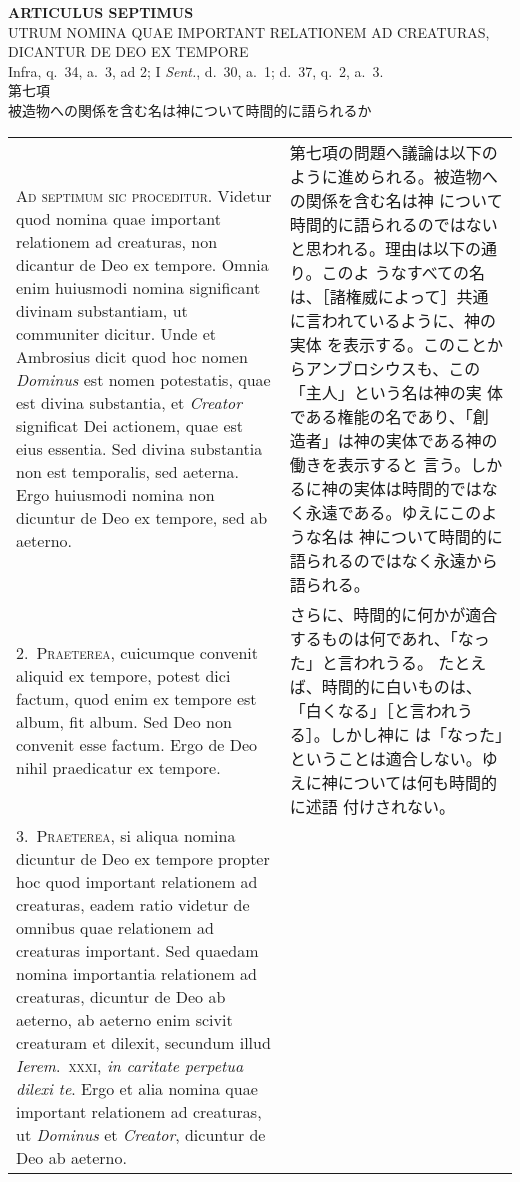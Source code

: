 \documentclass[paper=a4paper,fontsize=10pt,jafontsize=9pt,titlepage]{jlreq}
\begin{document}
\begin{center}
{\Large {\bfseries ARTICULUS SEPTIMUS}}\\
{\large UTRUM NOMINA QUAE IMPORTANT RELATIONEM AD CREATURAS, DICANTUR
DE DEO EX TEMPORE}\\
{\footnotesize Infra, q.~34, a.~3, ad 2; I {\itshape Sent.}, d.~30,
a.~1; d.~37, q.~2, a.~3.}\\
{\Large 第七項\\被造物への関係を含む名は神について時間的に語られるか}
\end{center}

\begin{longtable}{p{21em}p{21em}}

{\huge A}{\scshape d septimum sic proceditur}. Videtur quod nomina
quae important relationem ad creaturas, non dicantur de Deo ex
tempore. Omnia enim huiusmodi nomina significant divinam substantiam,
ut communiter dicitur. Unde et Ambrosius dicit quod hoc nomen
{\itshape Dominus} est nomen potestatis, quae est divina substantia,
et {\itshape Creator} significat Dei actionem, quae est eius
essentia. Sed divina substantia non est temporalis, sed aeterna. Ergo
huiusmodi nomina non dicuntur de Deo ex tempore, sed ab aeterno.

&

第七項の問題へ議論は以下のように進められる。被造物への関係を含む名は神
について時間的に語られるのではないと思われる。理由は以下の通り。このよ
うなすべての名は、［諸権威によって］共通に言われているように、神の実体
を表示する。このことからアンブロシウスも、この「主人」という名は神の実
体である権能の名であり、「創造者」は神の実体である神の働きを表示すると
言う。しかるに神の実体は時間的ではなく永遠である。ゆえにこのような名は
神について時間的に語られるのではなく永遠から語られる。

\\

2.~{\scshape Praeterea}, cuicumque convenit aliquid ex tempore, potest
dici factum, quod enim ex tempore est album, fit album. Sed Deo non
convenit esse factum. Ergo de Deo nihil praedicatur ex tempore.

&

さらに、時間的に何かが適合するものは何であれ、「なった」と言われうる。
たとえば、時間的に白いものは、「白くなる」［と言われうる］。しかし神に
は「なった」ということは適合しない。ゆえに神については何も時間的に述語
付けされない。

\\

3.~{\scshape Praeterea}, si aliqua nomina dicuntur de Deo ex tempore
propter hoc quod important relationem ad creaturas, eadem ratio
videtur de omnibus quae relationem ad creaturas important. Sed quaedam
nomina importantia relationem ad creaturas, dicuntur de Deo ab
aeterno, ab aeterno enim scivit creaturam et dilexit, secundum illud
{\itshape Ierem}.~{\scshape xxxi}, {\itshape in caritate perpetua
dilexi te}. Ergo et alia nomina quae important relationem ad
creaturas, ut {\itshape Dominus} et {\itshape Creator}, dicuntur de
Deo ab aeterno.


\end{longtable}
\end{document}

